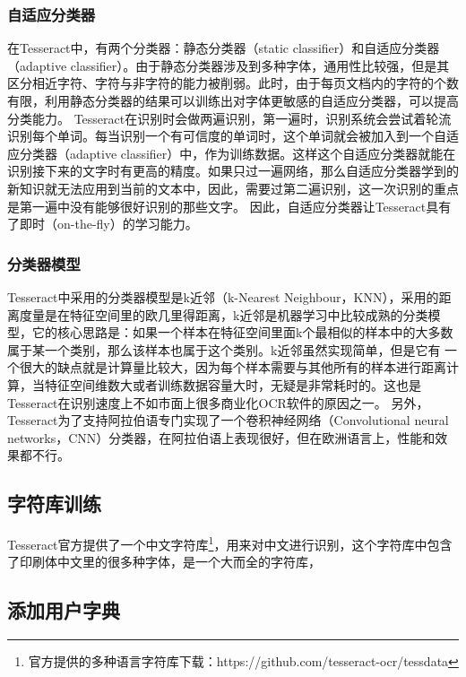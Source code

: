 \subsubsection*{自适应分类器}
在Tesseract中，有两个分类器：静态分类器（static classifier）和自适应分类器（adaptive classifier）。由于静态分类器涉及到多种字体，通用性比较强，但是其区分相近字符、字符与非字符的能力被削弱。此时，由于每页文档内的字符的个数有限，利用静态分类器的结果可以训练出对字体更敏感的自适应分类器，可以提高分类能力。%
Tesseract在识别时会做两遍识别，第一遍时，识别系统会尝试着轮流识别每个单词。每当识别一个有可信度的单词时，这个单词就会被加入到一个自适应分类器（adaptive classifier）中，作为训练数据。这样这个自适应分类器就能在识别接下来的文字时有更高的精度。如果只过一遍网络，那么自适应分类器学到的新知识就无法应用到当前的文本中，因此，需要过第二遍识别，这一次识别的重点是第一遍中没有能够很好识别的那些文字。%
因此，自适应分类器让Tesseract具有了即时（on-the-fly）的学习能力。

\subsubsection*{分类器模型}
Tesseract中采用的分类器模型是k近邻（k-Nearest Neighbour，KNN），采用的距离度量是在特征空间里的欧几里得距离，k近邻是机器学习中比较成熟的分类模型，它的核心思路是：如果一个样本在特征空间里面k个最相似的样本中的大多数属于某一个类别，那么该样本也属于这个类别。k近邻虽然实现简单，但是它有 一个很大的缺点就是计算量比较大，因为每个样本需要与其他所有的样本进行距离计算，当特征空间维数大或者训练数据容量大时，无疑是非常耗时的。这也是Tesseract在识别速度上不如市面上很多商业化OCR软件的原因之一。
另外，Tesseract为了支持阿拉伯语专门实现了一个卷积神经网络（Convolutional neural networks，CNN）分类器，在阿拉伯语上表现很好，但在欧洲语言上，性能和效果都不行。%

\subsection{字符库训练}
Tesseract官方提供了一个中文字符库\footnote{官方提供的多种语言字符库下载：https://github.com/tesseract-ocr/tessdata}，用来对中文进行识别，这个字符库中包含了印刷体中文里的很多种字体，是一个大而全的字符库，

\subsection{添加用户字典}


